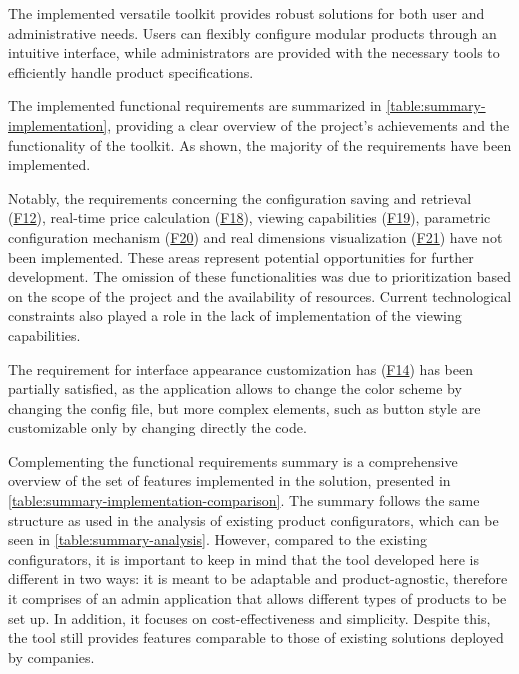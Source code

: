 The implemented versatile toolkit provides robust solutions for both user and administrative needs. Users can flexibly configure modular products through an intuitive interface, while administrators are provided with the necessary tools to efficiently handle product specifications.

The implemented functional requirements are summarized in \autoref{table:summary-implementation}, providing a clear overview of the project's achievements and the functionality of the toolkit. As shown, the majority of the requirements have been implemented.

Notably, the requirements concerning the configuration saving and retrieval (\hyperref[itm:F12]{F12}), real-time price calculation (\hyperref[itm:F18]{F18}),  viewing capabilities (\hyperref[itm:F19]{F19}), parametric configuration mechanism (\hyperref[itm:F20]{F20}) and real dimensions visualization (\hyperref[itm:F21]{F21}) have not been implemented. These areas represent potential opportunities for further development. The omission of these functionalities was due to prioritization based on the scope of the project and the availability of resources. Current technological constraints also played a role in the lack of implementation of the  viewing capabilities.

The requirement for interface appearance customization has (\hyperref[itm:F14]{F14}) has been partially satisfied, as the application allows to change the color scheme by changing the config file, but more complex elements, such as button style are customizable only by changing directly the  code.

Complementing the functional requirements summary is a comprehensive overview of the set of features implemented in the solution, presented in \autoref{table:summary-implementation-comparison}. The summary follows the same structure as used in the analysis of existing product configurators, which can be seen in \autoref{table:summary-analysis}. However, compared to the existing configurators, it is important to keep in mind that the tool developed here is different in two ways: it is meant to be adaptable and product-agnostic, therefore it comprises of an admin application that allows different types of products to be set up. In addition, it focuses on cost-effectiveness and simplicity. Despite this, the tool still provides features comparable to those of existing solutions deployed by companies.

